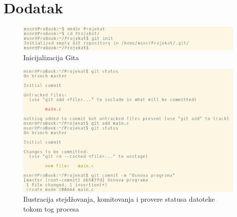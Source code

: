 \documentclass[a4paper]{article}
\begin{document}
{
\appendix
 

\appendix
\section{Dodatak}


\begin{figure}[h!]
\begin{center}
\includegraphics[scale=0.8]{images/init.png}
\end{center}
\caption{Inicijalizacija Gita}
\label{fig:git_init}
\end{figure}

\begin{figure}[h!]
\centering
\includegraphics[scale=0.8]{images/commit.png}
\caption{Ilustracija stejdžovanja, komitovanja i provere statusa datoteke tokom tog procesa}
\label{fig:git_commit}
\end{figure}

}
\end{document}
